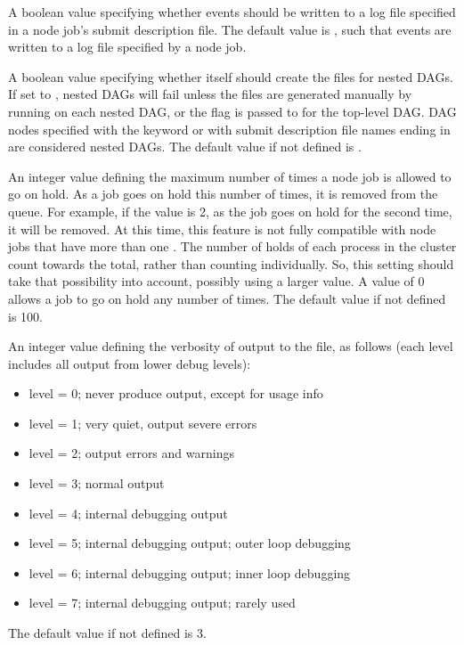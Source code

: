 \begin{description}
\label{param:DAGManSuppressJobLogs}
\item[\Macro{DAGMAN\_SUPPRESS\_JOB\_LOGS}]
  A boolean value specifying whether events should be written to a log file
  specified in a node job's submit description file.
  The default value is , such that events are written to
  a log file specified by a node job.

\label{param:DAGManGenerateSubDagSubmits}
\item[\Macro{DAGMAN\_GENERATE\_SUBDAG\_SUBMITS}]
  A boolean value specifying whether  itself should
  create the  files for nested DAGs.  
  If set to , nested DAGs will fail unless
  the  files are generated manually by running
    on each nested DAG, or the
   flag is passed to  for the
  top-level DAG.
  DAG nodes specified with the
   keyword or with submit description file names ending
  in  are considered nested DAGs.
  The default value if not defined is .

\label{param:DAGManMaxJobHolds}
\item[\Macro{DAGMAN\_MAX\_JOB\_HOLDS}]
  An integer value defining the maximum number of times a node job is
  allowed to go on hold. As a job goes on hold this number of
  times, it is removed from the queue.  For example, if the value
  is 2, as the job goes on hold for the second time,
  it will be removed.
  At this time, this feature is not fully compatible with node jobs
  that have more than one .
  The number of holds of each process in the cluster count towards the
  total, rather than counting individually.
  So, this setting should take that possibility into account,
  possibly using a larger value.
  A value of 0 allows a job to go on hold any number of times.
  The default value if not defined is 100.

\label{param:DAGManVerbosity}
\item[\Macro{DAGMAN\_VERBOSITY}]
  An integer value defining the verbosity of output to the
   file, as follows (each level includes all output
  from lower debug levels):
  \begin{itemize}
    \item level = 0; never produce output,
          except for usage info
    \item level = 1; very quiet, output severe errors
    \item level = 2; output errors and warnings
    \item level = 3; normal output
    \item level = 4; internal debugging output
    \item level = 5; internal debugging output; outer loop debugging
    \item level = 6; internal debugging output; inner loop debugging
    \item level = 7; internal debugging output; rarely used
  \end{itemize}
  The default value if not defined is 3.


\end{description}
